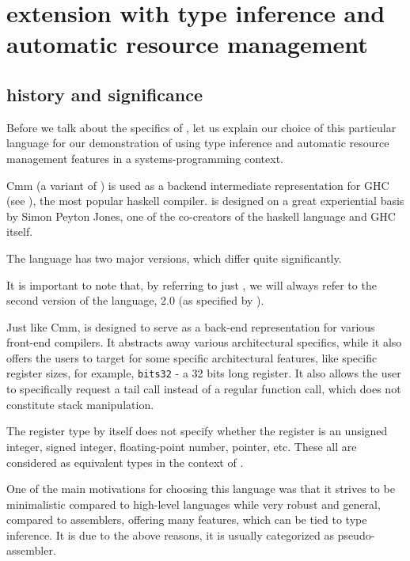 \chapter{\cmm{} extension with type inference and automatic resource management}

\label{chap2}

\section{\cmm{} history and significance}

Before we talk about the specifics of \cmm{}, let us explain our choice of this particular language for our demonstration of using type inference and automatic resource management features in a systems-programming context.

Cmm (a variant of \cmm{}) is used as a backend intermediate representation for GHC (see \cite{haskellbackends}), the most popular haskell compiler. \cmm{} is designed on a great experiential basis by Simon Peyton Jones, one of the co-creators of the haskell language and GHC itself.

\begin{remark}
    The \cmm{} language has two major versions, which differ quite significantly.

    It is important to note that, by referring to just \cmm{}, we will always refer to the second version of the language, \cmm{} 2.0 (as specified by \cite{ramsey2005c}).
\end{remark}

Just like Cmm, \cmm{} is designed to serve as a back-end representation for various front-end compilers. It abstracts away various architectural specifics, while it also offers the users to target for some specific architectural features, like specific register sizes, for example, \lstinline{bits32} - a 32 bits long register. It also allows the user to specifically request a tail call instead of a regular function call, which does not constitute stack manipulation.

The register type by itself does not specify whether the register is an unsigned integer, signed integer, floating-point number, pointer, etc. These all are considered as equivalent types in the context of \cmm{}.

One of the main motivations for choosing this language was that it strives to be minimalistic compared to high-level languages while very robust and general, compared to assemblers, offering many features, which can be tied to type inference. It is due to the above reasons, it is usually categorized as pseudo-assembler.

